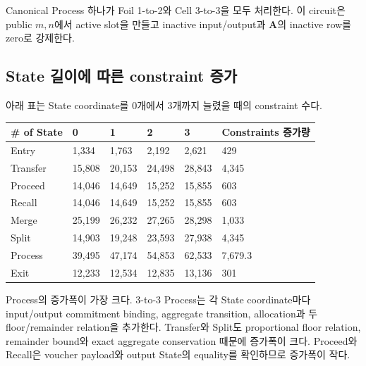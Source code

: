 \documentclass[11pt,a4paper]{extarticle}
\begin{document}
Canonical Process 하나가 Foil 1-to-2와 Cell 3-to-3을 모두 처리한다. 이 circuit은 public
$m,n$에서 active slot을 만들고 inactive input/output과 $\mathbf{A}$의 inactive row를 zero로
강제한다.

\subsection{State 길이에 따른 constraint 증가}

아래 표는 State coordinate를 0개에서 3개까지 늘렸을 때의 constraint 수다.

\begin{center}
  \begin{tabular}{@{}llllll@{}}
    \toprule
    \# of State & \multicolumn{1}{l}{0} & \multicolumn{1}{l}{1} & \multicolumn{1}{l}{2} & \multicolumn{1}{l}{3} & Constraints 증가량 \\
    \midrule
    Entry       & 1,334                 & 1,763                 & 2,192                 & 2,621                 & 429             \\
    Transfer    & 15,808                & 20,153                & 24,498                & 28,843                & 4,345           \\
    Proceed     & 14,046                & 14,649                & 15,252                & 15,855                & 603             \\
    Recall      & 14,046                & 14,649                & 15,252                & 15,855                & 603             \\
    Merge       & 25,199                & 26,232                & 27,265                & 28,298                & 1,033           \\
    Split       & 14,903                & 19,248                & 23,593                & 27,938                & 4,345           \\
    Process     & 39,495                & 47,174                & 54,853                & 62,533                & 7,679.3         \\
    Exit        & 12,233                & 12,534                & 12,835                & 13,136                & 301             \\
    \bottomrule
  \end{tabular}
\end{center}

Process의 증가폭이 가장 크다. 3-to-3 Process는 각 State coordinate마다 input/output
commitment binding, aggregate transition, allocation과 두 floor/remainder relation을
추가한다. Transfer와 Split도 proportional floor relation, remainder bound와 exact aggregate
conservation 때문에 증가폭이 크다. Proceed와 Recall은 voucher payload와 output State의
equality를 확인하므로 증가폭이 작다.
\end{document}
